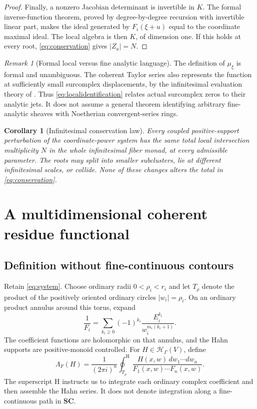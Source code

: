 \documentclass[11pt,oneside]{article}
\numberwithin{equation}{section}
\newtheorem{corollary}[theorem]{Corollary}
\theoremstyle{definition}
\theoremstyle{remark}\newtheorem{remark}[theorem]{Remark}
\newcommand{\SC}{\mathbf{SC}}
\newcommand{\HH}{\mathcal H_{\Gamma}}
\newcommand{\hoint}{\mathop{\oint}\nolimits^{\mathrm H}}
\begin{document}
\begin{proof}
Finally, a nonzero Jacobian determinant is invertible in \(K\). The formal inverse-function theorem, proved by degree-by-degree recursion with invertible linear part, makes the ideal generated by \(F_i(\xi+u)\) equal to the coordinate maximal ideal. The local algebra is then \(K\), of dimension one. If this holds at every root, \eqref{eq:conservation} gives \(|Z_a|=N\).
\end{proof}

\begin{remark}[Formal local versus fine analytic language]
The definition of \(\mu_\xi\) is formal and unambiguous. The coherent Taylor series also represents the function at sufficiently small surcomplex displacements, by the infinitesimal evaluation theory of \cite{Source}. Thus \eqref{eq:localidentification} relates actual surcomplex zeros to their analytic jets. It does not assume a general theorem identifying arbitrary fine-analytic sheaves with Noetherian convergent-series rings.
\end{remark}

\begin{corollary}[Infinitesimal conservation law]
Every coupled positive-support perturbation of the coordinate-power system has the same total local intersection multiplicity \(N\) in the whole infinitesimal fiber monad, at every admissible parameter. The roots may split into smaller subclusters, lie at different infinitesimal scales, or collide. None of these changes alters the total in \eqref{eq:conservation}.
\end{corollary}

\section{A multidimensional coherent residue functional}\label{sec:residue}
\subsection{Definition without fine-continuous contours}
Retain \eqref{eq:system}. Choose ordinary radii \(0<\rho_i<r_i\) and let \(T_\rho\) denote the product of the positively oriented ordinary circles \(|w_i|=\rho_i\). On an ordinary product annulus around this torus, expand
\begin{equation}\label{eq:inverseFi}
 \frac1{F_i}
 =\sum_{k_i\geq0}(-1)^{k_i}
 \frac{E_i^{k_i}}{w_i^{m_i(k_i+1)}}.
\end{equation}
The coefficient functions are holomorphic on that annulus, and the Hahn supports are positive-monoid controlled. For \(H\in\HH(V)\), define
\begin{equation}\label{eq:lambda}
 \Lambda_F(H)
 =\frac1{(2\pi i)^n}\hoint_{T_\rho}
 \frac{H(x,w)\,dw_1\cdots dw_n}{F_1(x,w)\cdots F_n(x,w)}.
\end{equation}
The superscript \(\mathrm H\) instructs us to integrate each ordinary complex coefficient and then assemble the Hahn series. It does not denote integration along a fine-continuous path in \(\SC\).
\end{document}
